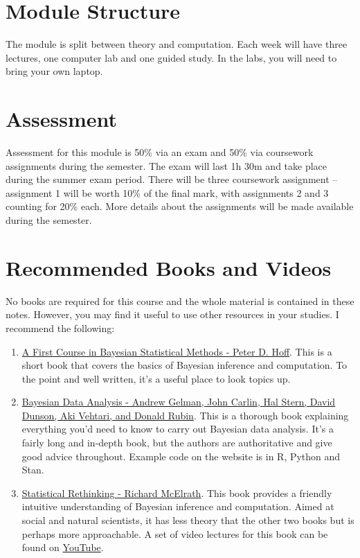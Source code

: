 \documentclass[
]{book}
\begin{document}
\hypertarget{module-structure}{%
\section{Module Structure}\label{module-structure}}

The module is split between theory and computation. Each week will have three lectures, one computer lab and one guided study. In the labs, you will need to bring your own laptop.

\hypertarget{assessment}{%
\section{Assessment}\label{assessment}}

Assessment for this module is 50\% via an exam and 50\% via coursework
assignments during the semester. The exam will last 1h 30m and take
place during the summer exam period. There will be three coursework
assignment -- assignment 1 will be worth 10\% of the final mark, with
assignments 2 and 3 counting for 20\% each. More details about the
assignments will be made available during the semester.

\hypertarget{recommended-books-and-videos}{%
\section{Recommended Books and Videos}\label{recommended-books-and-videos}}

No books are required for this course and the whole material is
contained in these notes. However, you may find it useful to use other
resources in your studies. I recommend the following:

\begin{enumerate}
\def\labelenumi{\arabic{enumi}.}
\item
  \href{https://link.springer.com/book/10.1007/978-0-387-92407-6}{A First Course in Bayesian Statistical Methods - Peter D.
  Hoff}.
  This is a short book that covers the basics of Bayesian inference
  and computation. To the point and well written, it's a useful place
  to look topics up.
\item
  \href{http://www.stat.columbia.edu/~gelman/book/}{Bayesian Data Analysis - Andrew Gelman, John Carlin, Hal Stern,
  David Dunson, Aki Vehtari, and Donald
  Rubin}. This is a
  thorough book explaining everything you'd need to know to carry out
  Bayesian data analysis. It's a fairly long and in-depth book, but
  the authors are authoritative and give good advice throughout.
  Example code on the website is in R, Python and Stan.
\item
  \href{https://xcelab.net/rm/statistical-rethinking/}{Statistical Rethinking - Richard
  McElrath}. This book
  provides a friendly intuitive understanding of Bayesian inference
  and computation. Aimed at social and natural scientists, it has less
  theory that the other two books but is perhaps more approachable. A
  set of video lectures for this book can be found on
  \href{https://www.youtube.com/playlist?list=PLDcUM9US4XdMROZ57-OIRtIK0aOynbgZN}{YouTube}.
\end{enumerate}
\end{document}
